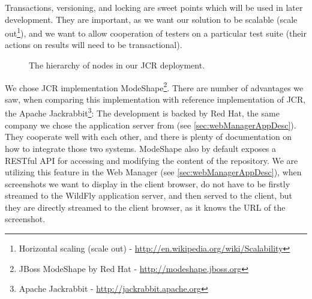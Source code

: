 \documentclass[11pt,oneside,final]{fithesis2}
\begin{document}
    Transactions, versioning, and locking are sweet points which will be used in later development. They are important, as we want
    our solution to be scalable 
    (scale out\footnote{Horizontal scaling (scale out) - \url{http://en.wikipedia.org/wiki/Scalability}}),
    and we want to allow cooperation of testers on a particular test suite (their actions on results will need to be transactional).
    
    \begin{figure}[!htb]
      \begin{center}
      \leavevmode
      \centerline{}
      \end{center}
      \caption{The hierarchy of nodes in our JCR deployment.}
      \label{fig:ourJCRHierarchy}
    \end{figure}
    
    We chose JCR implementation ModeShape\footnote{JBoss ModeShape by Red Hat - \url{http://modeshape.jboss.org}}. There are number
    of advantages we saw, when comparing this implementation with reference implementation of JCR, the Apache 
    Jackrabbit\footnote{Apache Jackrabbit - \url{http://jackrabbit.apache.org}}: The development is backed by Red Hat, the same 
    company we chose the application server from (see \ref{sec:webManagerAppDesc}). 
    They cooperate well with each other, and there is plenty of documentation on how to integrate those two systems.
    ModeShape also by default exposes a RESTful API for accessing and modifying the content of the repository. We are utilizing 
    this feature in the Web Manager (see \ref{sec:webManagerAppDesc}), when screenshots we want to display in the client browser,
    do not have to be firstly streamed to the WildFly application server, and then served to the client, but they are directly
    streamed to the client browser, as it knows the URL of the screenshot.
    
\end{document}
